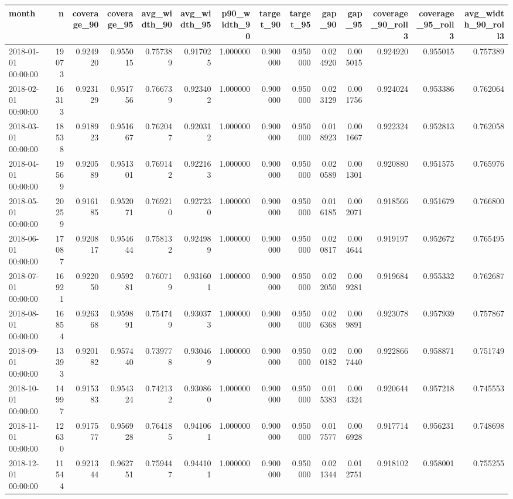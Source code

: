 \begin{tabular}{lrrrrrrrrrrrrr}
\toprule
month & n & coverage_90 & coverage_95 & avg_width_90 & avg_width_95 & p90_width_90 & target_90 & target_95 & gap_90 & gap_95 & coverage_90_roll3 & coverage_95_roll3 & avg_width_90_roll3 \\
\midrule
2018-01-01 00:00:00 & 19073 & 0.924920 & 0.955015 & 0.757389 & 0.917025 & 1.000000 & 0.900000 & 0.950000 & 0.024920 & 0.005015 & 0.924920 & 0.955015 & 0.757389 \\
2018-02-01 00:00:00 & 16313 & 0.923129 & 0.951756 & 0.766739 & 0.923402 & 1.000000 & 0.900000 & 0.950000 & 0.023129 & 0.001756 & 0.924024 & 0.953386 & 0.762064 \\
2018-03-01 00:00:00 & 18538 & 0.918923 & 0.951667 & 0.762047 & 0.920312 & 1.000000 & 0.900000 & 0.950000 & 0.018923 & 0.001667 & 0.922324 & 0.952813 & 0.762058 \\
2018-04-01 00:00:00 & 19569 & 0.920589 & 0.951301 & 0.769142 & 0.922163 & 1.000000 & 0.900000 & 0.950000 & 0.020589 & 0.001301 & 0.920880 & 0.951575 & 0.765976 \\
2018-05-01 00:00:00 & 20259 & 0.916185 & 0.952071 & 0.769210 & 0.927230 & 1.000000 & 0.900000 & 0.950000 & 0.016185 & 0.002071 & 0.918566 & 0.951679 & 0.766800 \\
2018-06-01 00:00:00 & 17087 & 0.920817 & 0.954644 & 0.758132 & 0.924989 & 1.000000 & 0.900000 & 0.950000 & 0.020817 & 0.004644 & 0.919197 & 0.952672 & 0.765495 \\
2018-07-01 00:00:00 & 16921 & 0.922050 & 0.959281 & 0.760719 & 0.931601 & 1.000000 & 0.900000 & 0.950000 & 0.022050 & 0.009281 & 0.919684 & 0.955332 & 0.762687 \\
2018-08-01 00:00:00 & 16854 & 0.926368 & 0.959891 & 0.754749 & 0.930373 & 1.000000 & 0.900000 & 0.950000 & 0.026368 & 0.009891 & 0.923078 & 0.957939 & 0.757867 \\
2018-09-01 00:00:00 & 13393 & 0.920182 & 0.957440 & 0.739778 & 0.930469 & 1.000000 & 0.900000 & 0.950000 & 0.020182 & 0.007440 & 0.922866 & 0.958871 & 0.751749 \\
2018-10-01 00:00:00 & 14997 & 0.915383 & 0.954324 & 0.742132 & 0.930860 & 1.000000 & 0.900000 & 0.950000 & 0.015383 & 0.004324 & 0.920644 & 0.957218 & 0.745553 \\
2018-11-01 00:00:00 & 12630 & 0.917577 & 0.956928 & 0.764185 & 0.941061 & 1.000000 & 0.900000 & 0.950000 & 0.017577 & 0.006928 & 0.917714 & 0.956231 & 0.748698 \\
2018-12-01 00:00:00 & 11544 & 0.921344 & 0.962751 & 0.759447 & 0.944101 & 1.000000 & 0.900000 & 0.950000 & 0.021344 & 0.012751 & 0.918102 & 0.958001 & 0.755255 \\

\end{tabular}
